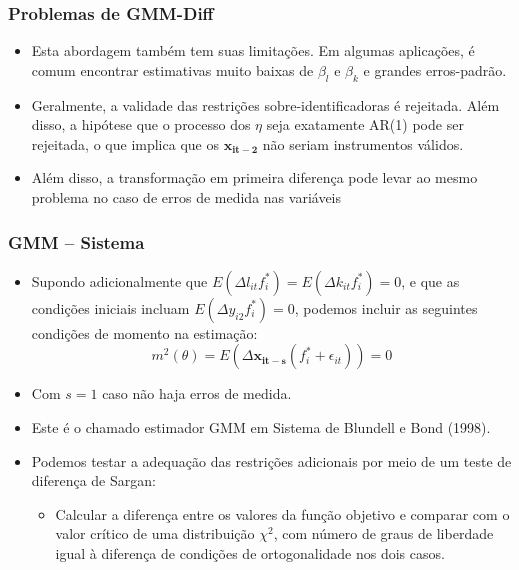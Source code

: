 \documentclass{beamer}
\begin{document}
\begin{frame}\frametitle{Problemas de GMM-Diff}

\begin{itemize}
\item Esta abordagem também tem suas limitações. Em algumas aplicações,
é comum encontrar estimativas muito baixas de $\beta_{l}$ e $\beta_{k}$
e grandes erros-padrão.
\item Geralmente, a validade das restrições sobre-identificadoras é rejeitada.
Além disso, a hipótese que o processo dos $\eta$ seja exatamente
AR(1) pode ser rejeitada, o que implica que os $\mathbf{x_{it-2}}$
não seriam instrumentos válidos.
\item Além disso, a transformação em primeira diferença pode levar ao mesmo
problema no caso de erros de medida nas variáveis
\end{itemize}
\end{frame}

\begin{frame}\frametitle{GMM -- Sistema}

\begin{itemize}
\item Supondo adicionalmente que $E(\Delta l_{it}f_{i}^{*})=E(\Delta k_{it}f_{i}^{*})=0$,
e que as condições iniciais incluam $E(\Delta y_{i2}f_{i}^{*})=0$,
podemos incluir as seguintes condições de momento na estimação:
\[
m^{2}(\theta)=E(\Delta\mathbf{x_{it-s}}(f_{i}^{*}+\epsilon_{it}))=0
\]
\item Com $s=1$ caso não haja erros de medida.
\item Este é o chamado estimador GMM em Sistema de Blundell e Bond (1998).
\item Podemos testar a adequação das restrições adicionais por meio de um
teste de diferença de Sargan:

\begin{itemize}
\item Calcular a diferença entre os valores da função objetivo e comparar
com o valor crítico de uma distribuição $\chi^{2}$, com número de
graus de liberdade igual à diferença de condições de ortogonalidade
nos dois casos.
\end{itemize}
\end{itemize}
\end{frame}

\end{document}
